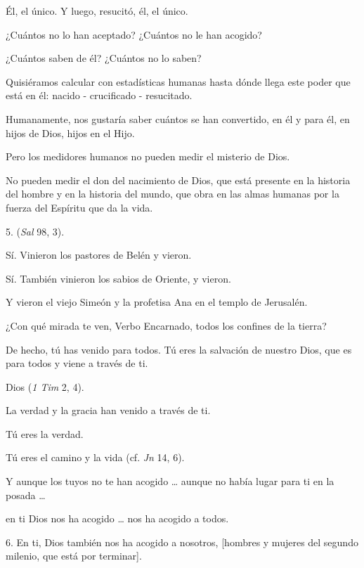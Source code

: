 \begin{body}
					Él, el único. Y luego, resucitó, él, el único.
					
					¿Cuántos no lo han aceptado? ¿Cuántos no le han acogido?
					
					¿Cuántos saben de él? ¿Cuántos no lo saben?
					
					Quisiéramos calcular con estadísticas humanas hasta dónde llega este poder que está en él: nacido - crucificado - resucitado.
					
					Humanamente, nos gustaría saber cuántos se han convertido, en él y para él, en hijos de Dios, hijos en el Hijo.
					
					Pero los medidores humanos no pueden medir el misterio de Dios.
					
					No pueden medir el don del nacimiento de Dios, que está presente en la historia del hombre y en la historia del mundo, que obra en las almas humanas por la fuerza del Espíritu que da la vida.
					
					5.  (\emph{Sal} 98, 3).
					
					Sí. Vinieron los pastores de Belén y vieron.
					
					Sí. También vinieron los sabios de Oriente, y vieron.
					
					Y vieron el viejo Simeón y la profetisa Ana en el templo de Jerusalén.
					
					¿Con qué mirada te ven, Verbo Encarnado, todos los confines de la tierra?
					
					De hecho, tú has venido para todos. Tú eres la salvación de nuestro Dios, que es para todos y viene a través de ti.
					
					Dios  (\emph{1 Tim} 2, 4).
					
					La verdad y la gracia han venido a través de ti.
					
					Tú eres la verdad.
					
					Tú eres el camino y la vida (cf. \emph{Jn} 14, 6).
					
					Y aunque los tuyos no te han acogido \ldots{} aunque no había lugar para ti en la posada \ldots{}
					
					en ti Dios nos ha acogido \ldots{} nos ha acogido a todos.
					
					6. En ti, Dios también nos ha acogido a nosotros, {[}hombres y mujeres del segundo milenio, que está por terminar{]}.
					

\end{body}
